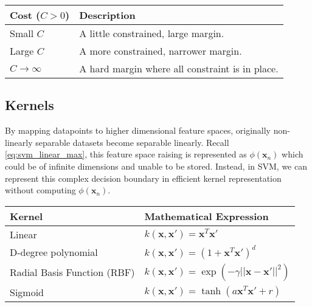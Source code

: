 \parbox{\linewidth} {
	\centering
  \begin{tabularx}{\textwidth}{|l|X|}
    \hline
    \textbf{Cost ($C > 0 $)}	  & \textbf{Description}
    \\ \hline
    Small $C$ 							    & A little constrained, large margin. 
    \\ \hline
    Large $C$  	                & A more constrained, narrower margin.
		\\ \hline
    $C \rightarrow \infty$      & A hard margin where all constraint is in place.
    \\ \hline

  \end{tabularx}
	\label{tab:c_vals}
}


\subsection{Kernels}
By mapping datapoints to higher dimensional feature spaces, originally non-linearly separable datasets become separable linearly. Recall \autoref{eq:svm_linear_max}, this feature space raising is represented as $\phi \left (\mathbf{x}_n \right)$ which could be of infinite dimensions and unable to be stored. Instead, in SVM, we can represent this complex decision boundary in efficient kernel representation without computing $\phi \left (\mathbf{x}_n \right)$. 

\parbox{\linewidth} {
  \centering
  \def\arraystretch{1.5}
  \begin{tabularx}{\textwidth}{|X|X|}
    \hline
    \textbf{Kernel}     & \textbf{Mathematical Expression}
    \\ \hline
    Linear              & $k(\mathbf{x},\mathbf{x'}) = \mathbf{x}^T\mathbf{x'}$
    \\ \hline
    D-degree polynomial & $k(\mathbf{x},\mathbf{x'}) = \left(1+\mathbf{x}^T\mathbf{x'}\right)^d$ 
    \\ \hline
    Radial Basis Function (RBF) & $k(\mathbf{x},\mathbf{x'}) = \exp \left( -\gamma ||\mathbf{x}-\mathbf{x'}||^2 \right)$
		\\ \hline
    Sigmoid             & $k(\mathbf{x},\mathbf{x'}) = \tanh \left(a\mathbf{x}^T\mathbf{x'} + r\right)$
    \\ \hline
  \end{tabularx} 
  \label{tab:kernel_vals}
}

